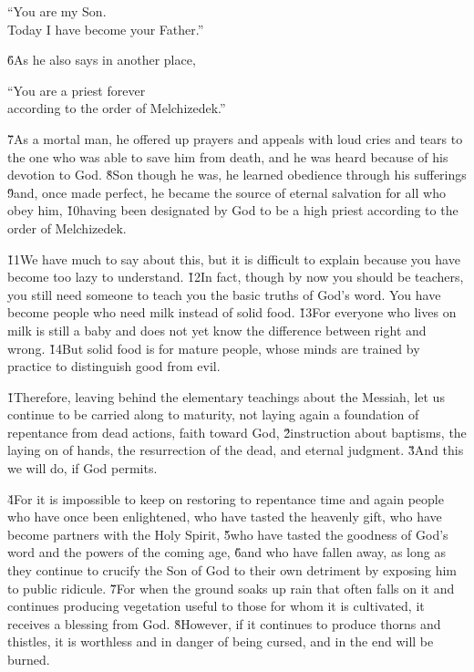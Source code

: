 \begin{poetry}
\poeml ``You are my Son. \\
\poemll    Today I have become your Father.''
\end{poetry}

\v{6}As he also says in another place,

\begin{poetry}
\poeml ``You are a priest forever \\
\poemll    according to the order of Melchizedek.''
\end{poetry}

\v{7}As a mortal man, he offered up prayers and appeals with loud cries and tears to the one who was able to save him from death, and he was heard because of his devotion to God. \v{8}Son though he was, he learned obedience through his sufferings \v{9}and, once made perfect, he became the source of eternal salvation for all who obey him, \v{10}having been designated by God to be a high priest according to the order of Melchizedek.

\v{11}We have much to say about this, but it is difficult to explain because you have become too lazy to understand. \v{12}In fact, though by now you should be teachers, you still need someone to teach you the basic truths of God's word. You have become people who need milk instead of solid food. \v{13}For everyone who lives on milk is still a baby and does not yet know the difference between right and wrong. \v{14}But solid food is for mature people, whose minds are trained by practice to distinguish good from evil.

\v{1}Therefore, leaving behind the elementary teachings about the Messiah, let us continue to be carried along to maturity, not laying again a foundation of repentance from dead actions, faith toward God, \v{2}instruction about baptisms, the laying on of hands, the resurrection of the dead, and eternal judgment. \v{3}And this we will do, if God permits.

\v{4}For it is impossible to keep on restoring to repentance time and again people who have once been enlightened, who have tasted the heavenly gift, who have become partners with the Holy Spirit, \v{5}who have tasted the goodness of God's word and the powers of the coming age, \v{6}and who have fallen away, as long as they continue to crucify the Son of God to their own detriment by exposing him to public ridicule. \v{7}For when the ground soaks up rain that often falls on it and continues producing vegetation useful to those for whom it is cultivated, it receives a blessing from God. \v{8}However, if it continues to produce thorns and thistles, it is worthless and in danger of being cursed, and in the end will be burned.

